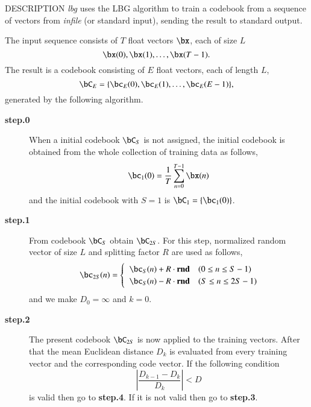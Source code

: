 \begin{qsection}{DESCRIPTION}
{\em lbg} uses the LBG algorithm to train a codebook 
from a sequence of vectors from {\em infile} (or standard input), 
sending the result to standard output.

The input sequence consists of $T$ float vectors $\bx$, 
each of size $L$
\begin{displaymath} 
\bx(0), \bx(1), \dots, \bx(T-1). 
\end{displaymath}
The result is a codebook consisting of $E$ float vectors, 
each of length $L$,
\begin{displaymath}
\bC_E =\{ \bc_E(0), \bc_E(1), \dots, \bc_E(E-1) \}, 
\end{displaymath}
generated by the following algorithm.

\begin{description}
\item[\bf step.0~~~]
When a initial codebook $\bC_S$ is not assigned,
the initial codebook is obtained from the whole collection of
training data as follows,
\begin{displaymath}
\bc_1(0) = \frac{1}{T} \sum_{n=0}^{T-1} \bx(n)
\end{displaymath}
and the initial codebook with $S = 1$ is $\bC_1 = \{ \bc_1(0) \}$.

\item[\bf step.1~~~]
From codebook $\bC_{S}$ obtain $\bC_{2S}$.
For this step, normalized random vector of size $L$ and splitting factor
$R$ are used as follows,
\begin{displaymath}
\bc_{2S}(n)= \begin{cases}
\;\;\bc_S(n) + R \cdot \bm{\mathrm{rnd}} & ( 0 \le n \le S-1 ) \\
\;\;\bc_S(n) - R \cdot \bm{\mathrm{rnd}} & ( S \le n \le 2S-1 )
\end{cases}
\end{displaymath}
and we make $D_0 = \infty$ and $k = 0$.

\item[\bf step.2~~~]
The present codebook $\bC_{2S}$ is now applied
to the training vectors.
After that the mean Euclidean distance $D_k$ is evaluated
from every training vector and the corresponding code vector.
If the following condition 
\begin{displaymath}
|\frac{D_{k-1}-D_{k}}{D_{k}}| < D
\end{displaymath}
is valid then go to {\bf step.4}.
If it is not valid then go to {\bf step.3}.


\end{description}
\end{qsection}
